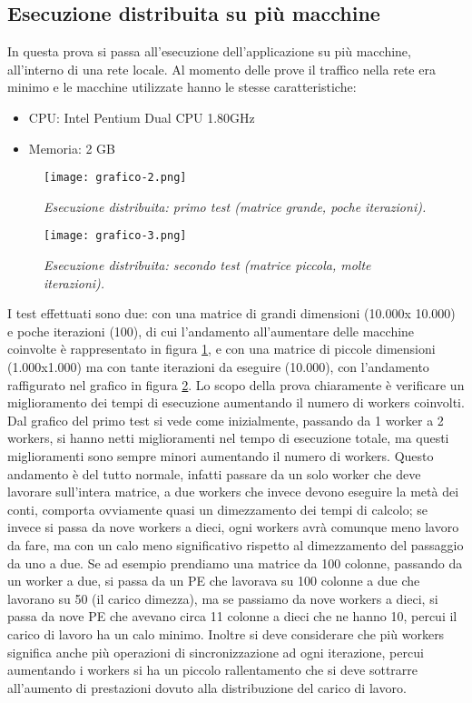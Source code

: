 \subsection{Esecuzione distribuita su pi\`u macchine}
In questa prova si passa all'esecuzione dell'applicazione su pi\`u macchine, all'interno di una rete locale. Al momento delle prove il traffico nella rete era minimo e le macchine utilizzate hanno le stesse caratteristiche:
\begin{itemize}
  \item CPU: Intel Pentium Dual CPU 1.80GHz
  \item Memoria: 2 GB
\end{itemize}
\begin{figure}[ht]
  \centering
  \texttt{[image: grafico-2.png]}
  \caption{\emph{Esecuzione distribuita: primo test (matrice grande, poche iterazioni).}}
  \label{fig:graph_2}
\end{figure}
\begin{figure}[ht]
  \centering
  \texttt{[image: grafico-3.png]}
  \caption{\emph{Esecuzione distribuita: secondo test (matrice piccola, molte iterazioni).}}
  \label{fig:graph_3}
\end{figure}
I test effettuati sono due: con una matrice di grandi dimensioni (10.000x 10.000) e poche iterazioni (100), di cui l'andamento all'aumentare delle macchine coinvolte \`e rappresentato in figura \ref{fig:graph_2}, e con una matrice di piccole dimensioni (1.000x1.000) ma con tante iterazioni da eseguire (10.000), con l'andamento raffigurato nel grafico in figura \ref{fig:graph_3}. Lo scopo della prova chiaramente \`e verificare un miglioramento dei tempi di esecuzione aumentando il numero di workers coinvolti. Dal grafico del primo test si vede come inizialmente, passando da 1 worker a 2 workers, si hanno netti miglioramenti nel tempo di esecuzione totale, ma questi miglioramenti sono sempre minori aumentando il numero di workers. Questo andamento \`e del tutto normale, infatti passare da un solo worker che deve lavorare sull'intera matrice, a due workers che invece devono eseguire la met\`a dei conti, comporta ovviamente quasi un dimezzamento dei tempi di calcolo; se invece si passa da nove workers a dieci, ogni workers avr\`a comunque meno lavoro da fare, ma con un calo meno significativo rispetto al dimezzamento del passaggio da uno a due. Se ad esempio prendiamo una matrice da 100 colonne, passando da un worker a due, si passa da un PE che lavorava su 100 colonne a due che lavorano su 50 (il carico dimezza), ma se passiamo da nove workers a dieci, si passa da nove PE che avevano circa 11 colonne a dieci che ne hanno 10, percui il carico di lavoro ha un calo minimo. Inoltre si deve considerare che pi\`u workers significa anche pi\`u operazioni di sincronizzazione ad ogni iterazione, percui aumentando i workers si ha un piccolo rallentamento che si deve sottrarre all'aumento di prestazioni dovuto alla distribuzione del carico di lavoro.

